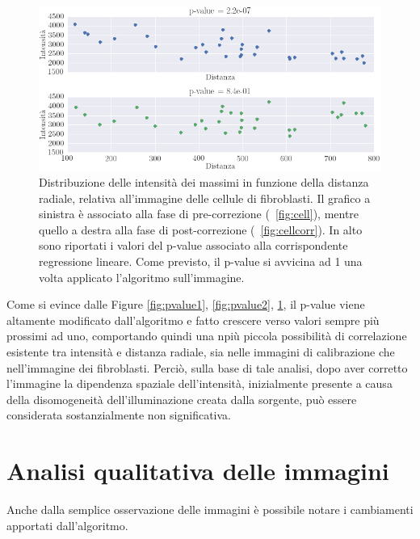 \begin{figure}
 \centering
 \includegraphics[scale=.55]{img/CAP4pvalue3.png}
 \caption{\small{
 Distribuzione delle intensità dei massimi in funzione della distanza radiale, relativa all'immagine delle cellule di fibroblasti. Il grafico a sinistra è associato alla fase di pre-correzione (\figurename~\ref{fig:cell}), mentre quello a destra alla fase di post-correzione (\figurename~\ref{fig:cellcorr}). In alto sono riportati i valori del p-value associato alla corrispondente regressione lineare. Come previsto, il p-value si avvicina ad 1 una volta applicato l'algoritmo sull'immagine.}}
 \label{fig:pvalue3}
\end{figure}

Come si evince dalle Figure \ref{fig:pvalue1}, \ref{fig:pvalue2}, \ref{fig:pvalue3}, il p-value viene altamente modificato dall'algoritmo e fatto crescere verso valori sempre più prossimi ad uno, comportando quindi una npiù piccola possibilità di correlazione esistente tra intensità e distanza radiale, sia nelle immagini di calibrazione che nell'immagine dei fibroblasti. 
Perciò, sulla base di tale analisi, dopo aver corretto l'immagine la dipendenza spaziale dell'intensità, inizialmente presente a causa della disomogeneità dell'illuminazione creata dalla sorgente, può essere considerata sostanzialmente non significativa.


\section{Analisi qualitativa delle immagini}

Anche dalla semplice osservazione delle immagini è possibile notare i cambiamenti apportati dall'algoritmo.


